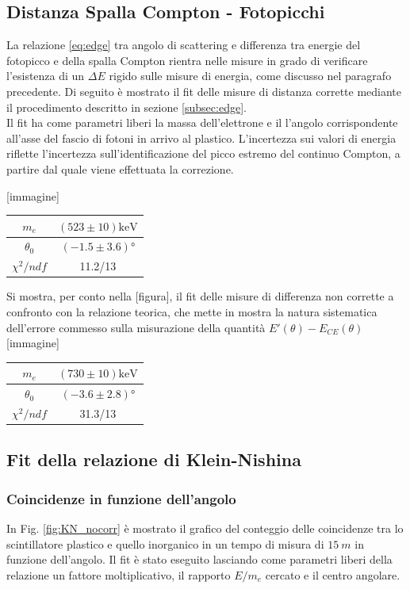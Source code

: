 \documentclass[8pt]{extarticle}
\begin{document}
\subsection{Distanza Spalla Compton - Fotopicchi}
La relazione \ref{eq:edge} tra angolo di scattering e differenza tra energie del fotopicco e della spalla Compton rientra nelle misure in grado di verificare l'esistenza di un $\Delta E$ rigido sulle misure di energia, come discusso nel paragrafo precedente.
Di seguito è mostrato il fit delle misure di distanza corrette mediante il procedimento descritto in sezione \ref{subsec:edge}.\\
Il fit ha come parametri liberi la massa dell'elettrone e il l'angolo corrispondente all'asse del fascio di fotoni in arrivo al plastico. 
L'incertezza sui valori di energia riflette l'incertezza sull'identificazione del picco estremo del continuo Compton, a partire dal quale viene effettuata la correzione.

[immagine]
\\
\begin{center}
\begin{tabular}{|c|c|}
\hline 
$m_e$ & $(523\pm 10) \mathrm{keV}$ \\ 
\hline 
$\theta_0$ & $(-1.5\pm 3.6)°$ \\ 
\hline 
$\chi^2 /ndf$ & 11.2/13 \\ 
\hline 
\end{tabular} 
\end{center}

Si mostra, per conto nella [figura], il fit delle misure di differenza non corrette a confronto con la relazione teorica, che mette in mostra la natura sistematica dell'errore commesso sulla misurazione della quantità $E'(\theta)-E_{CE}(\theta)$
[immagine]
\begin{tabular}{|c|c|}
\hline 
$m_e$ & $(730\pm 10) \mathrm{keV}$ \\ 
\hline 
$\theta_0$ & $(-3.6\pm 2.8)°$ \\ 
\hline 
$\chi^2 /ndf$ & 31.3/13 \\ 
\hline 
\end{tabular}

\subsection{Fit della relazione di Klein-Nishina}
\subsubsection{Coincidenze in funzione dell'angolo}
In Fig. \ref{fig:KN_nocorr} è mostrato il grafico del conteggio delle coincidenze tra lo scintillatore plastico e quello inorganico in un tempo di misura di $15 \ m$ in funzione dell'angolo. Il fit è stato eseguito lasciando come parametri liberi della relazione un fattore moltiplicativo, il rapporto $E/m_e$ cercato e il centro angolare. \\
\end{document}
